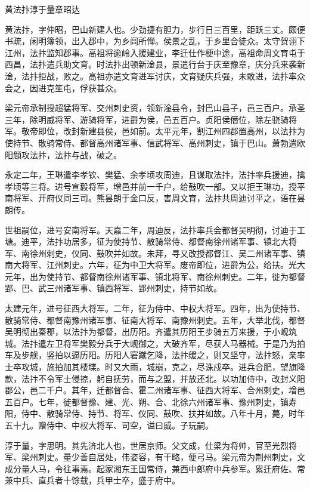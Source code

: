 \documentclass[]{article}
\begin{document}
黄法抃淳于量章昭达

黄法抃，字仲昭，巴山新建人也。少劲捷有胆力，步行日三百里，距跃三丈。颇便书疏，闲明簿领，出入郡中，为乡闾所惮。侯景之乱，于乡里合徒众。太守贺诩下江州，法抃监知郡事。高祖将逾岭入援建业，李迁仕作梗中途，高祖命周文育屯于西昌，法抃遣兵助文育。时法抃出顿新淦县，景遣行台于庆至豫章，庆分兵来袭新淦，法抃拒战，败之。高祖亦遣文育进军讨庆，文育疑庆兵强，未敢进，法抃率众会之，因进克笙屯，俘获甚众。

梁元帝承制授超猛将军、交州刺史资，领新淦县令，封巴山县子，邑三百户。承圣三年，除明威将军、游骑将军，进爵为侯，邑五百户。贞阳侯僭位，除左骁骑将军。敬帝即位，改封新建县侯，邑如前。太平元年，割江州四郡置高州，以法抃为使持节、散骑常侍、都督高州诸军事、信武将军、高州刺史，镇于巴山。萧勃遣欧阳頠攻法抃，法抃与战，破之。

永定二年，王琳遣李孝钦、樊猛、余孝顷攻周迪，且谋取法抃，法抃率兵援迪，擒孝顷等三将。进号宣毅将军，增邑并前一千户，给鼓吹一部。又以拒王琳功，授平南将军、开府仪同三司。熊昙朗于金口反，害周文育，法抃共周迪讨平之，语在昙朗传。

世祖嗣位，进号安南将军。天嘉二年，周迪反，法抃率兵会都督吴明彻，讨迪于工塘。迪平，法抃功居多，征为使持节、散骑常侍、都督南徐州诸军事、镇北大将军、南徐州刺史，仪同、鼓吹并如故。未拜，寻又改授都督江、吴二州诸军事、镇南大将军、江州刺史。六年，征为中卫大将军。废帝即位，进爵为公，给扶。光大元年，出为使持节、都督南徐州诸军事、镇北将军、南徐州刺史。二年，徙为都督郢、巴、武三州诸军事、镇西将军、郢州刺史，持节如故。

太建元年，进号征西大将军。二年，征为侍中、中权大将军。四年，出为使持节、散骑常侍、都督南豫州诸军事、征南大将军、南豫州刺史。五年，大举北伐，都督吴明彻出秦郡，以法抃为都督，出历阳。齐遣其历阳王步骑五万来援，于小岘筑城。法抃遣左卫将军樊毅分兵于大岘御之，大破齐军，尽获人马器械。于是乃为拍车及步舰，竖拍以逼历阳。历阳人窘蹴乞降，法抃缓之，则又坚守，法抃怒，亲率士卒攻城，施拍加其楼堞。时又大雨，城崩，克之，尽诛戍卒。进兵合肥，望旗降款，法抃不令军士侵掠，躬自抚劳，而与之盟，并放还北。以功加侍中，改封义阳郡公，邑二千户。其年，迁都督合、霍二州诸军事、征西大将军、合州刺史，增邑五百户。七年，徙都督豫、建、光、朔、合、北徐六州诸军事、豫州刺史，镇寿阳，侍中、散骑常侍、持节、将军、仪同、鼓吹、扶并如故。八年十月，薨，时年五十九。赠侍中、中权大将军、司空，谥曰威。子玩嗣。

淳于量，字思明。其先济北人也，世居京师。父文成，仕梁为将帅，官至光烈将军、梁州刺史。量少善自居处，伟姿容，有干略，便弓马。梁元帝为荆州刺史，文成分量人马，令往事焉。起家湘东王国常侍，兼西中郎府中兵参军。累迁府佐、常兼中兵、直兵者十馀载，兵甲士卒，盛于府中。
\end{document}
